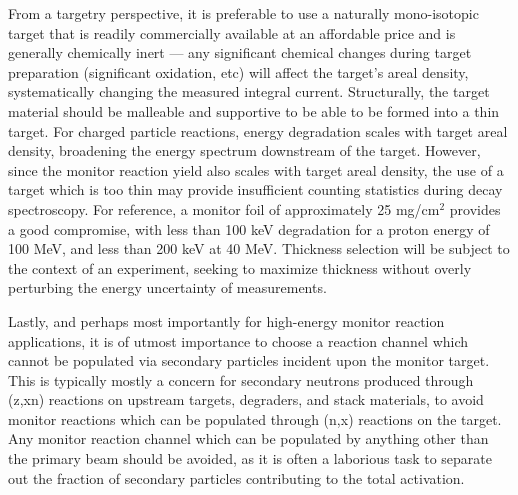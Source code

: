 From a targetry  perspective, it is preferable to use a naturally mono-isotopic target that is readily commercially available at an affordable price and is generally chemically inert --- any significant chemical changes during target preparation (significant oxidation, etc) will affect the target's areal density, systematically changing the measured integral current. 
Structurally, the target material should be malleable and supportive to be able to be formed into a thin target.
For charged particle reactions,  energy degradation scales with target areal density,  broadening the energy spectrum downstream of the target.
However, since the monitor reaction yield also scales with target areal density, the use of a target which is too thin may provide insufficient counting statistics during decay spectroscopy.
For reference, a monitor foil of approximately 25 mg/cm$^2$ provides a good compromise, with less than 100 keV degradation for a proton energy of 100 MeV, and less than 200 keV at 40 MeV.
Thickness selection will be subject to the context of an experiment, seeking to maximize thickness without overly perturbing the energy uncertainty of  measurements.



Lastly, and perhaps most importantly for high-energy monitor reaction applications, it is  of utmost importance to choose a reaction channel which cannot be populated via secondary particles incident upon the monitor target.
This is typically mostly a concern for secondary neutrons produced through (z,xn) reactions on upstream targets, degraders, and stack materials, to avoid monitor reactions which can be populated through (n,x) reactions on the target.
Any monitor reaction channel which can be populated by anything other than the primary beam should be avoided, as it is often a laborious task to separate out the fraction of secondary particles contributing to the total activation.  





